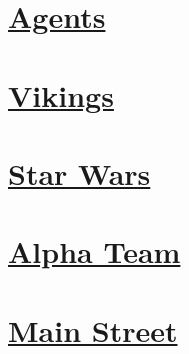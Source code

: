 \section*{\centering \hyperref[contents]{Agents}}\label{image:Agents}
\begin{figure}[H]\begin{flushleft}
\end{flushleft}\end{figure}
\vspace{2.5cm}
\section*{\centering \hyperref[contents]{Vikings}}\label{image:Vikings}
\begin{figure}[H]\begin{flushleft}
\end{flushleft}\end{figure}
\vspace{2.5cm}
\section*{\centering \hyperref[contents]{Star Wars}}\label{image:Star Wars}
\begin{figure}[H]\begin{flushleft}
\end{flushleft}\end{figure}
\vspace{2.5cm}
\section*{\centering \hyperref[contents]{Alpha Team}}\label{image:Alpha Team}
\begin{figure}[H]\begin{flushleft}
\end{flushleft}\end{figure}
\vspace{2.5cm}
\section*{\centering \hyperref[contents]{Main Street}}\label{image:Main Street}
\begin{figure}[H]\begin{flushleft}
\end{flushleft}\end{figure}
\vspace{2.5cm}
